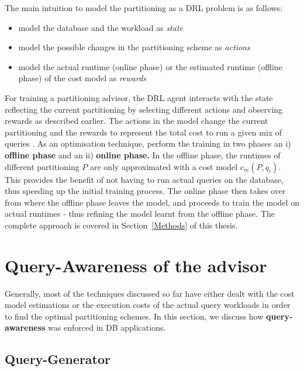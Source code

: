 The main intuition to model the partitioning as a DRL problem is as follows:
\begin{itemize}
    \item model the database and the workload as \textit{state}
    \item model the possible changes in the partitioning scheme as \textit{actions}
    \item model the actual runtime (online phase) or the estimated runtime (offline phase) of the cost model as \textit{rewards}
\end{itemize}

For training a partitioning advisor, the DRL agent interacts with the state reflecting the current partitioning by selecting different actions and observing rewards as described earlier. The actions in the model change the current partitioning and the rewards to represent the total cost to run a given mix of queries \cite{Hilprecht:2019:TLP:3329859.3329876}. 
As an optimisation technique, \citeauthor{Hilprecht:2019:TLP:3329859.3329876} perform the training in two phases an i) \textbf{offline phase} and an ii) \textbf{online phase.} In the offline phase, the runtimes of different partitioning $P$ are only approximated with a cost model $c_m(P,q_i)$. This provides the benefit of not having to run actual queries on the database, thus speeding up the initial training process. The online phase then takes over from where the offline phase leaves the model, and proceeds to train the model on actual runtimes - thus refining the model learnt from the offline phase. The complete approach is covered in Section~\ref{Methods} of this thesis.

\section{Query-Awareness of the advisor}
Generally, most of the techniques discussed so far have either dealt with the cost model estimations or the execution costs of the actual query workloads in order to find the optimal partitioning schemes. In this section, we discuss how \textbf{query-awareness} was enforced in DB applications. 

\subsection{Query-Generator}

